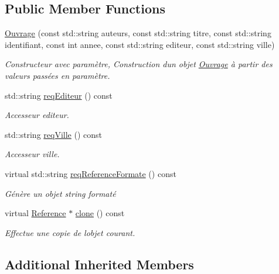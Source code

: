 \subsection*{Public Member Functions}
\begin{DoxyCompactItemize}
\item 
\hyperlink{classbiblio_1_1Ouvrage_a2a7a544096ff1bcc1060c279abbfde4c}{Ouvrage} (const std\+::string auteurs, const std\+::string titre, const std\+::string identifiant, const int annee, const std\+::string editeur, const std\+::string ville)
\begin{DoxyCompactList}\small\item\em Constructeur avec paramètre, Construction d\textquotesingle{}un objet \hyperlink{classbiblio_1_1Ouvrage}{Ouvrage} à partir des valeurs passées en paramètre. \end{DoxyCompactList}\item 
std\+::string \hyperlink{classbiblio_1_1Ouvrage_a79ed5a4c5eb760f892826c754f15b64b}{req\+Editeur} () const
\begin{DoxyCompactList}\small\item\em Accesseur editeur. \end{DoxyCompactList}\item 
std\+::string \hyperlink{classbiblio_1_1Ouvrage_a9118fb41bc14debb563864920f957de7}{req\+Ville} () const
\begin{DoxyCompactList}\small\item\em Accesseur ville. \end{DoxyCompactList}\item 
virtual std\+::string \hyperlink{classbiblio_1_1Ouvrage_a7bbeb2555e634b63cb4566084014dc0d}{req\+Reference\+Formate} () const
\begin{DoxyCompactList}\small\item\em Génère un objet string formaté \end{DoxyCompactList}\item 
virtual \hyperlink{classbiblio_1_1Reference}{Reference} $\ast$ \hyperlink{classbiblio_1_1Ouvrage_ab25cefbd63b37d6a0d2cb34e28a32077}{clone} () const
\begin{DoxyCompactList}\small\item\em Effectue une copie de l\textquotesingle{}objet courant. \end{DoxyCompactList}\end{DoxyCompactItemize}
\subsection*{Additional Inherited Members}



